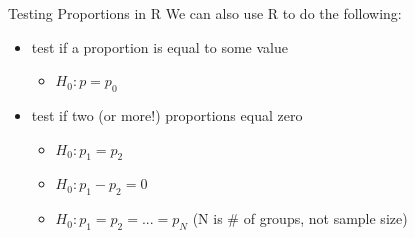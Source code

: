 \documentclass{beamer}
\begin{document}
\begin{frame}{Testing Proportions in R}
We can also use R to do the following:
\begin{itemize}
    \item test if a proportion is equal to some value
    \begin{itemize}
        \item $H_0: p = p_0$
    \end{itemize}
    \item test if two (or more!) proportions equal zero
    \begin{itemize}
        \item $H_0: p_1 = p_2$
        \item $H_0: p_1 - p_2 = 0$
        \item $H_0: p_1 = p_2 = ... = p_N$ (N is \# of groups, not sample size)
    \end{itemize}
\end{itemize}
\end{frame}
\end{document}
